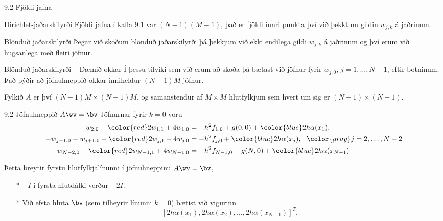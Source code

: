 \begin{frame}{9.2 Fjöldi jafna}
 \begin{block}{Dirichlet-jaðarskilyrði}
  Fjöldi jafna í kafla 9.1 var $(N-1)(M-1)$, það er fjöldi innri punkta því
  við þekktum gildin $w_{j,k}$ á jaðrinum.
 \end{block}
  \pause
  
 \begin{block}{Blönduð jaðarskilyrði}
  Þegar við skoðum blönduð jaðarskilyrði þá þekkjum við ekki endilega gildi 
  $w_{j,k}$ á jaðrinum og því erum við hugsanlega með fleiri jöfnur.
 \end{block} 
  \pause
  
 \begin{block}{Blönduð jaðarskilyrði -- Dæmið okkar}
  Í þessu tilviki sem við erum að skoða þá bætast við jöfnur fyrir
  $w_{j,0}$, $j=1,\ldots,N-1$, eftir botninum. Það þýðir að jöfnuhneppið 
  okkar inniheldur $(N-1)M$ jöfnur. 
  \pause
  
  Fylkið $A$ er því $(N-1)M \times (N-1)M$, og samanstendur af 
  $M \times M$ hlutfylkjum sem hvert um sig er $(N-1)\times (N-1)$.
 \end{block}

\end{frame}



\begin{frame}{9.2 Jöfnuhneppið $A\wv = \bv$}
Jöfnurnar fyrir $k=0$ voru
\begin{align*}
- w_{2,0}  - {\color{red}2}w_{1,1} + 4w_{1,0} &= -h^2 f_{1,0} + g(0,0) + 
{\color{blue}2h\alpha(x_1)},\\
  -w_{j-1,0} - w_{j+1,0} - {\color{red}2}w_{j,1} + 4w_{j,0} &= -h^2 f_{j,0} + 
  {\color{blue}2h\alpha(x_j)}, 
   \ \ {\color{gray} j=2,\ldots,N-2}\\
  -w_{N-2,0}  - {\color{red}2}w_{N-1,1} + 4w_{N-1,0} &= -h^2 f_{N-1,0} + g(N,0) + 
  {\color{blue}2h\alpha(x_{N-1})}
 \end{align*} \pause
 
 Þetta breytir fyrstu hlutfylkjalínunni í jöfnuhneppinu $A\wv = \bv$, \pause
 \begin{itemize}
  \item[{\color{red} *}] $-I$ í fyrsta hlutdálki verður $-2I$.\pause
  \item[{\color{blue} *}] Við efsta hluta $\bv$ (sem tilheyrir línunni $k=0$)
  bætist við vigurinn 
  $$
    [2h\alpha(x_1),2h\alpha(x_2),\ldots,2h\alpha(x_{N-1})]^T.
   $$
 \end{itemize}
\end{frame}



